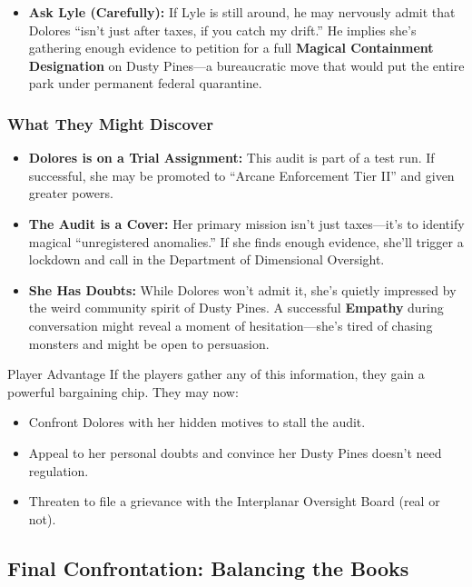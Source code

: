 \begin{multicols}{2}
\begin{itemize}
    \item \textbf{Ask Lyle (Carefully):} If Lyle is still around, he may nervously admit that Dolores “isn’t just after taxes, if you catch my drift.” He implies she’s gathering enough evidence to petition for a full \textbf{Magical Containment Designation} on Dusty Pines—a bureaucratic move that would put the entire park under permanent federal quarantine.
\end{itemize}

\subsubsection*{What They Might Discover}
\begin{itemize}
    \item \textbf{Dolores is on a Trial Assignment:} This audit is part of a test run. If successful, she may be promoted to “Arcane Enforcement Tier II” and given greater powers.
    \item \textbf{The Audit is a Cover:} Her primary mission isn’t just taxes—it’s to identify magical “unregistered anomalies.” If she finds enough evidence, she’ll trigger a lockdown and call in the Department of Dimensional Oversight.
    \item \textbf{She Has Doubts:} While Dolores won’t admit it, she’s quietly impressed by the weird community spirit of Dusty Pines. A successful \textbf{Empathy}  during conversation might reveal a moment of hesitation—she’s tired of chasing monsters and might be open to persuasion.
\end{itemize}

\begin{CommentBox}{Player Advantage}
    If the players gather any of this information, they gain a powerful bargaining chip. They may now:
    \begin{itemize}
        \item Confront Dolores with her hidden motives to stall the audit.
        \item Appeal to her personal doubts and convince her Dusty Pines doesn’t need regulation.
        \item Threaten to file a grievance with the Interplanar Oversight Board (real or not).
    \end{itemize}
\end{CommentBox}

\subsection{Final Confrontation: Balancing the Books}


\end{multicols}
